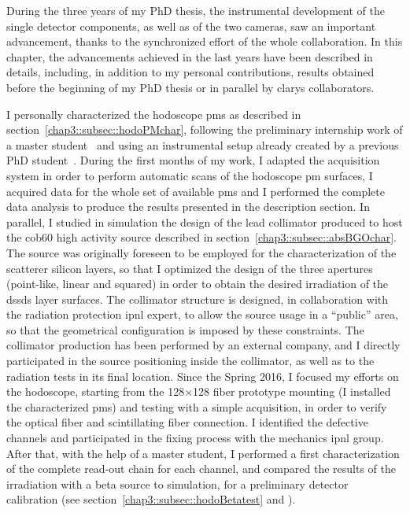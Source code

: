 During the three years of my PhD thesis, the instrumental development of the single detector components, as well as of the two cameras, saw an important advancement, thanks to the synchronized effort of the whole collaboration. In this chapter, the advancements achieved in the last years have been described in details, including, in addition to my personal contributions,  results obtained before the beginning of my PhD thesis or in parallel by \gls{clarys} collaborators.

I personally characterized the hodoscope \glspl{pm} as described in section~\ref{chap3::subsec::hodoPMchar}, following the preliminary internship work of a master student~\parencite{Coudurier2015} and using an instrumental setup already created by a previous PhD student~\parencite{Gaglione2013}. During the first months of my work, I adapted the acquisition system in order to perform automatic scans of the hodoscope \gls{pm} surfaces, I acquired data for the whole set of available \glspl{pm} and I performed the complete data analysis to produce the results presented in the description section.
In parallel, I studied in simulation the design of the lead collimator produced to host the \gls{cob60} high activity source described in section~\ref{chap3::subsec::absBGOchar}. The source was originally foreseen to be employed for the characterization of the scatterer silicon layers, so that I optimized the design of the three apertures (point-like, linear and squared) in order to obtain the desired irradiation of the \glspl{dssd} layer surfaces. The collimator structure is designed, in collaboration with the radiation protection \gls{ipnl} expert, to allow the source usage in a \enquote{public} area, so that the geometrical configuration is imposed by these constraints. The collimator production has been performed by an external company, and I directly participated in the source positioning inside the collimator, as well as to the radiation tests in its final location.
Since the Spring 2016, I focused my efforts on the hodoscope, starting from the 128$\times$128 fiber prototype mounting (I installed the characterized \glspl{pm}) and testing with a simple acquisition, in order to verify the optical fiber and scintillating fiber connection. I identified the defective channels and participated in the fixing process with the mechanics \gls{ipnl} group. After that, with the help of a master student, I performed a first characterization of the complete read-out chain for each channel, and compared the results of the irradiation with a beta source to simulation, for a preliminary detector calibration (see section~\ref{chap3::subsec::hodoBetatest} and \cite{Vallois2016}). 
